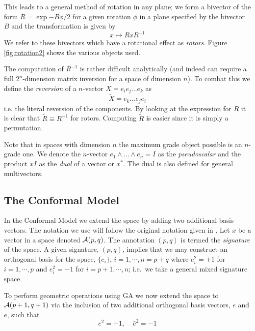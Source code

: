 This leads to a general method of rotation in any plane; we
form a bivector of the form $R = \exp{-B\phi/2}$ for a given rotation 
$\phi$ in a plane specified by the bivector $B$ and the transformation
is given by
\begin{displaymath}
x \mapsto RxR^{-1}
\end{displaymath}
We refer to these bivectors which have a rotational effect as \emph{rotors}.
Figure \ref{fig:rotation2} shows the various objects used.

The computation of $R^{-1}$ is rather difficult analytically (and indeed can
require a full $2^n$-dimension matrix inversion for a space of
dimension $n$). To combat this we define
the \emph{reversion} of a $n$-vector $X = e_ie_j...e_k$ as
\[
\tilde{X} = e_k...e_je_i
\]
i.e. the literal reversion of the components. By looking at the expression for
$R$ it is clear that $\tilde{R} \equiv R^{-1}$ for rotors. Computing $\tilde{R}$
is easier since it is simply a permutation.

Note that in spaces with dimension $n$ the maximum grade object 
possible is an $n$-grade
one. We denote the $n$-vector $e_1 \wedge ... \wedge e_n = I$ as the \emph{pseudoscalar}
and the product $xI$ as the \emph{dual} of a vector or $x^*$. The dual is also defined
for general multivectors.

\subsection{The Conformal Model}

In the Conformal Model \cite{GA:NFCM} we extend the space by adding two 
additional basis
vectors. 
The notation we use will follow the original notation given in
\cite{HS84}. Let $x$ be a vector in a space denoted ${\mathcal{A}}(p,q)$.
The annotation $(p,q)$ is termed the \emph{signature} of the space. 
A given signature, $(p,q)$, implies that we may construct an 
orthogonal basis for the space,
$\{e_i\}$, $i=1,\cdots,n=p+q$ where $e_i^2=+1$ for $i=1,\cdots,p$
and $e_i^2=-1$ for $i=p+1,\cdots,n$; i.e.\ we take a general mixed
signature space.  

To perform geometric operations using GA we now extend the space 
to ${\mathcal{A}}(p+1,q+1)$ via the inclusion of two additional orthogonal
basis  vectors, $e$ and
$\bar{e}$, such that
%
\[  e^2=+1,\;\;\;\; \bar{e}^2= -1
\]
%

